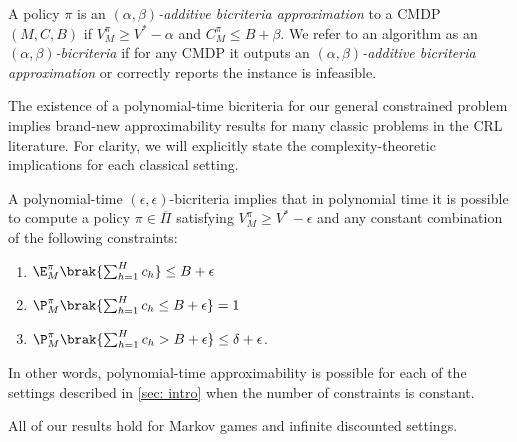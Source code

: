 \documentclass[pdftex, a4paper, 12pt]{article}
\newcommand{\jeremy}[1]{\textcolor{red}{#1}}
\newcommand{\gPi}{\overline{\Pi}}
\begin{document}
\begin{definition}[Bicriteria]\label{def: bicriteria}
    A policy $\pi$ is an \emph{$(\alpha, \beta)$-additive bicriteria approximation} to a CMDP $(M, C, B)$ if $V^{\pi}_M \geq V^* - \alpha$ and $C^{\pi}_M \leq B + \beta$. We refer to an algorithm as an \emph{$(\alpha, \beta)$-bicriteria} if for any CMDP it outputs an \emph{$(\alpha, \beta)$-additive bicriteria approximation} or correctly reports the instance is infeasible. 
\end{definition}


The existence of a polynomial-time bicriteria for our general constrained problem implies brand-new approximability results for many classic problems in the CRL literature. For clarity, we will explicitly state the complexity-theoretic implications for each classical setting. 

\begin{theorem}[Implications]\label{thm: results}
    A polynomial-time $(\epsilon, \epsilon)$-bicriteria implies that in polynomial time it is possible to compute a policy $\pi \in \gPi$ satisfying $V^{\pi}_M \geq V^* - \epsilon$ and any constant combination of the following constraints:
    \begin{enumerate}
        \item $\E_M^{\pi}\brak{\sum_{h = 1}^H c_h} \leq B + \epsilon$
        \item $\P^{\pi}_M\brak{\sum_{h = 1}^H c_h \leq B + \epsilon} = 1$
        \item $\P^{\pi}_M\brak{\sum_{h = 1}^H c_h > B + \epsilon} \leq \delta + \epsilon$.
    \end{enumerate}
    In other words, polynomial-time approximability is possible for each of the settings described in \cref{sec: intro} when the number of constraints is constant. 
\end{theorem}

\begin{remark}[Extensions]\label{remark: environments}
    All of our results hold for Markov games and infinite discounted settings. %
\end{remark}
\end{document}
